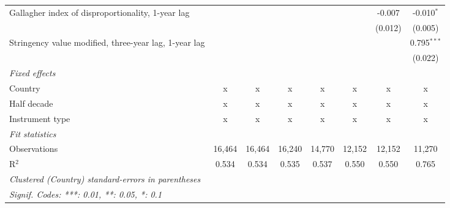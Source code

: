\begin{table}[htbp]
\begin{tabular}{lccccccc}
      Gallagher index of disproportionality, 1-year lag     &         &         &         &         &               & -0.007        & -0.010$^{*}$\\   
                                                            &         &         &         &         &               & (0.012)       & (0.005)\\   
      Stringency value modified, three-year lag, 1-year lag &         &         &         &         &               &               & 0.795$^{***}$\\   
                                                            &         &         &         &         &               &               & (0.022)\\   
      \emph{Fixed effects}\\
      Country                                               & x       & x       & x       & x       & x             & x             & x\\  
      Half decade                                           & x       & x       & x       & x       & x             & x             & x\\  
      Instrument type                                       & x       & x       & x       & x       & x             & x             & x\\  
      \midrule \emph{Fit statistics}\\
      Observations                                          & 16,464  & 16,464  & 16,240  & 14,770  & 12,152        & 12,152        & 11,270\\  
      R$^2$                                                 & 0.534   & 0.534   & 0.535   & 0.537   & 0.550         & 0.550         & 0.765\\  
      \midrule
      \multicolumn{8}{l}{\emph{Clustered (Country) standard-errors in parentheses}}\\
      \multicolumn{8}{l}{\emph{Signif. Codes: ***: 0.01, **: 0.05, *: 0.1}}\\
   \end{tabular}
\end{table}


